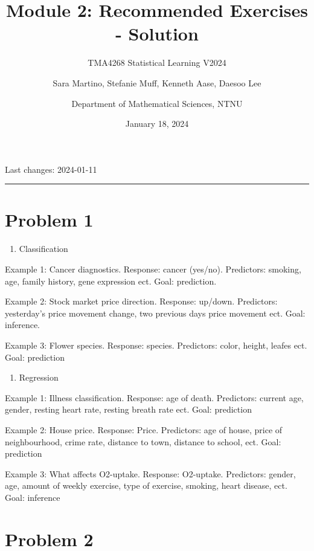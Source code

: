 \documentclass[
]{article}
\title{Module 2: Recommended Exercises - Solution}
\subtitle{TMA4268 Statistical Learning V2024}
\author{Sara Martino, Stefanie Muff, Kenneth Aase, Daesoo
Lee \and Department of Mathematical Sciences, NTNU}
\date{January 18, 2024}
\providecommand{\tightlist}{%
  \setlength{\itemsep}{0pt}\setlength{\parskip}{0pt}}
\begin{document}
\maketitle

Last changes: 2024-01-11

\begin{center}\rule{0.5\linewidth}{0.5pt}\end{center}

\hypertarget{problem-1}{%
\section{Problem 1}\label{problem-1}}

\begin{enumerate}
\def\labelenumi{\alph{enumi})}
\tightlist
\item
  Classification
\end{enumerate}

Example 1: Cancer diagnostics. Response: cancer (yes/no). Predictors:
smoking, age, family history, gene expression ect. Goal: prediction.

Example 2: Stock market price direction. Response: up/down. Predictors:
yesterday's price movement change, two previous days price movement ect.
Goal: inference.

Example 3: Flower species. Response: species. Predictors: color, height,
leafes ect. Goal: prediction

\begin{enumerate}
\def\labelenumi{\alph{enumi})}
\setcounter{enumi}{1}
\tightlist
\item
  Regression
\end{enumerate}

Example 1: Illness classification. Response: age of death. Predictors:
current age, gender, resting heart rate, resting breath rate ect. Goal:
prediction

Example 2: House price. Response: Price. Predictors: age of house, price
of neighbourhood, crime rate, distance to town, distance to school, ect.
Goal: prediction

Example 3: What affects O2-uptake. Response: O2-uptake. Predictors:
gender, age, amount of weekly exercise, type of exercise, smoking, heart
disease, ect. Goal: inference

\hypertarget{problem-2}{%
\section{Problem 2}\label{problem-2}}
\end{document}
